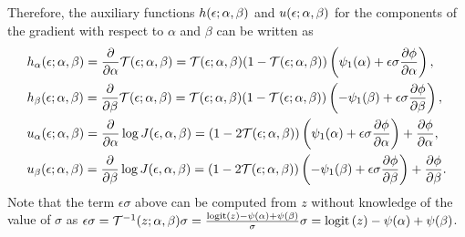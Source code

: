 \documentclass{article}
\begin{document}
Therefore, the auxiliary functions $h(\epsilon;\alpha,\beta)$ and $u(\epsilon;\alpha,\beta)$ for the components of the gradient with respect to $\alpha$ and $\beta$ can be written as
\begin{align}
    & h_{\alpha}(\epsilon;\alpha,\beta) = \frac{\partial}{\partial\alpha}\mathcal{T}(\epsilon;\alpha,\beta) = \mathcal{T}(\epsilon;\alpha,\beta)(1-\mathcal{T}(\epsilon;\alpha,\beta))\left( \psi_1(\alpha) + \epsilon\sigma\frac{\partial\phi}{\partial\alpha} \right) ,\\
    & h_{\beta}(\epsilon;\alpha,\beta) = \frac{\partial}{\partial\beta}\mathcal{T}(\epsilon;\alpha,\beta) = \mathcal{T}(\epsilon;\alpha,\beta)(1-\mathcal{T}(\epsilon;\alpha,\beta))\left( -\psi_1(\beta) + \epsilon\sigma\frac{\partial\phi}{\partial\beta} \right),\\
    & u_{\alpha}(\epsilon;\alpha,\beta) = \frac{\partial}{\partial\alpha}\log J(\epsilon,\alpha,\beta) = (1-2\mathcal{T}(\epsilon;\alpha,\beta))\left( \psi_1(\alpha) + \epsilon\sigma\frac{\partial\phi}{\partial\alpha} \right)+\frac{\partial\phi}{\partial\alpha},\\
    & u_{\beta}(\epsilon;\alpha,\beta) = \frac{\partial}{\partial\beta}\log J(\epsilon,\alpha,\beta) = (1-2\mathcal{T}(\epsilon;\alpha,\beta))\left( -\psi_1(\beta) + \epsilon\sigma\frac{\partial\phi}{\partial\beta} \right)+\frac{\partial\phi}{\partial\beta}.
\end{align}
Note that the term $\epsilon\sigma$ above can be computed from $z$ without knowledge of the value of $\sigma$ as $\epsilon\sigma=\mathcal{T}^{-1}(z;\alpha,\beta)\sigma = \frac{\textrm{logit}\left(z\right)-\psi(\alpha)+\psi(\beta)}{\sigma}\sigma=\textrm{logit}\left(z\right)-\psi(\alpha)+\psi(\beta)$.
\end{document}
